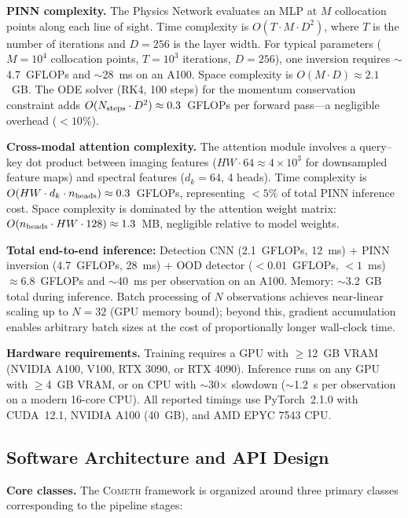 \documentclass[usenatbib]{mnras}
\begin{document}
\textbf{PINN complexity.} The Physics Network evaluates an MLP at $M$ collocation points along each line of sight. Time complexity is $O(T \cdot M \cdot D^2)$, where $T$ is the number of iterations and $D=256$ is the layer width. For typical parameters ($M=10^4$ collocation points, $T=10^3$ iterations, $D=256$), one inversion requires $\sim$4.7~GFLOPs and $\sim$28~ms on an A100. Space complexity is $O(M \cdot D) \approx 2.1$~GB. The ODE solver (RK4, 100 steps) for the momentum conservation constraint adds $O(N_{\rm steps} \cdot D^2) \approx 0.3$~GFLOPs per forward pass---a negligible overhead ($<10\%$).

\textbf{Cross-modal attention complexity.} The attention module involves a query--key dot product between imaging features ($HW \cdot 64 \approx 4 \times 10^3$ for downsampled feature maps) and spectral features ($d_k=64$, 4 heads). Time complexity is $O(HW \cdot d_k \cdot n_{\rm heads}) \approx 0.3$~GFLOPs, representing $<5\%$ of total PINN inference cost. Space complexity is dominated by the attention weight matrix: $O(n_{\rm heads} \cdot HW \cdot 128) \approx 1.3$~MB, negligible relative to model weights.

\textbf{Total end-to-end inference:} Detection CNN (2.1~GFLOPs, 12~ms) + PINN inversion (4.7~GFLOPs, 28~ms) + OOD detector ($<0.01$~GFLOPs, $<1$~ms) $\approx 6.8$~GFLOPs and $\sim$40~ms per observation on an A100. Memory: $\sim$3.2~GB total during inference. Batch processing of $N$ observations achieves near-linear scaling up to $N=32$ (GPU memory bound); beyond this, gradient accumulation enables arbitrary batch sizes at the cost of proportionally longer wall-clock time.

\textbf{Hardware requirements.} Training requires a GPU with $\geq$12~GB VRAM (NVIDIA A100, V100, RTX 3090, or RTX 4090). Inference runs on any GPU with $\geq$4~GB VRAM, or on CPU with $\sim$30$\times$ slowdown ($\sim$1.2~s per observation on a modern 16-core CPU). All reported timings use PyTorch~2.1.0 with CUDA~12.1, NVIDIA A100 (40~GB), and AMD EPYC 7543 CPU.

\subsection{Software Architecture and API Design}\label{sec:api}

\textbf{Core classes.} The \textsc{Cometh} framework is organized around three primary classes corresponding to the pipeline stages:
\end{document}
